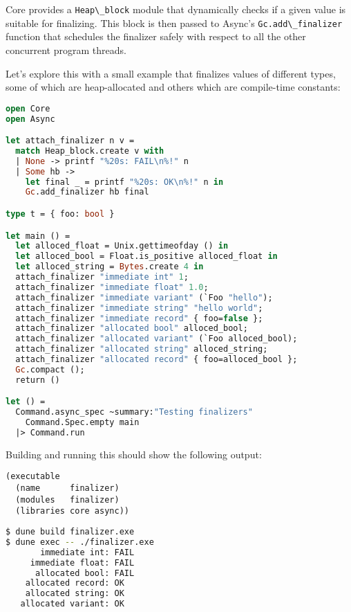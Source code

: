 Core provides a \passthrough{\lstinline!Heap\_block!} module that
dynamically checks if a given value is suitable for finalizing. This
block is then passed to Async's
\passthrough{\lstinline!Gc.add\_finalizer!} function that schedules the
finalizer safely with respect to all the other concurrent program
threads. 

Let's explore this with a small example that finalizes values of
different types, some of which are heap-allocated and others which are
compile-time constants:

\begin{lstlisting}[language=Caml]
open Core
open Async

let attach_finalizer n v =
  match Heap_block.create v with
  | None -> printf "%20s: FAIL\n%!" n
  | Some hb ->
    let final _ = printf "%20s: OK\n%!" n in
    Gc.add_finalizer hb final

type t = { foo: bool }

let main () =
  let alloced_float = Unix.gettimeofday () in
  let alloced_bool = Float.is_positive alloced_float in
  let alloced_string = Bytes.create 4 in
  attach_finalizer "immediate int" 1;
  attach_finalizer "immediate float" 1.0;
  attach_finalizer "immediate variant" (`Foo "hello");
  attach_finalizer "immediate string" "hello world";
  attach_finalizer "immediate record" { foo=false };
  attach_finalizer "allocated bool" alloced_bool;
  attach_finalizer "allocated variant" (`Foo alloced_bool);
  attach_finalizer "allocated string" alloced_string;
  attach_finalizer "allocated record" { foo=alloced_bool };
  Gc.compact ();
  return ()

let () =
  Command.async_spec ~summary:"Testing finalizers"
    Command.Spec.empty main
  |> Command.run
\end{lstlisting}

Building and running this should show the following output:

\begin{lstlisting}
(executable
  (name      finalizer)
  (modules   finalizer)
  (libraries core async))
\end{lstlisting}

\begin{lstlisting}[language=bash]
$ dune build finalizer.exe
$ dune exec -- ./finalizer.exe
       immediate int: FAIL
     immediate float: FAIL
      allocated bool: FAIL
    allocated record: OK
    allocated string: OK
   allocated variant: OK
\end{lstlisting}


